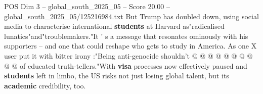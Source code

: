 \begin{textsample}{POS Dim 3 – global\_south\_2025\_05 – Score 20.00 – global\_south\_2025\_05/125216984.txt}
But Trump has doubled down, using social media to characterise international \textbf{students} at Harvard as"radicalised lunatics"and"troublemakers."It ' s a message that resonates ominously with his supporters -- and one that could reshape who gets to study in America.
As one X user put it with bitter irony :"Being anti-genocide shouldn't @ @ @ @ @ @ @ @ @ @ of educated truth-tellers."With \textbf{visa} processes now effectively paused and \textbf{students} left in limbo, the US risks not just losing global talent, but its \textbf{academic} credibility, too.

\end{textsample}
